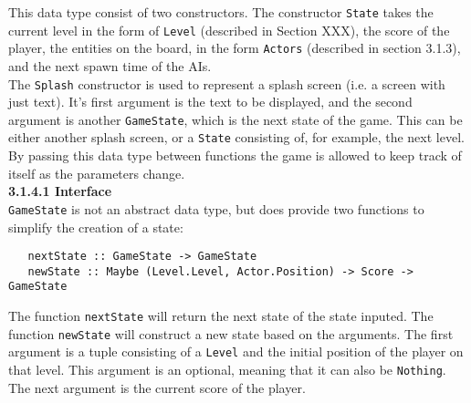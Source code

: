 \documentclass{article}
\begin{document}
    	\noindent This data type consist of two constructors. The constructor \texttt{State} takes the current level in the form of \texttt{Level} (described in Section XXX), the score of the player, the entities on the board, in the form \texttt{Actors} (described in section 3.1.3), and the next spawn time of the AIs. \\
    	\newline
    	The \texttt{Splash} constructor is used to represent a splash screen (i.e. a screen with just text). It's first argument is the text to be displayed, and the second argument is another \texttt{GameState}, which is the next state of the game. This can be either another splash screen, or a \texttt{State} consisting of, for example, the next level.\\
    	\newline
    	By passing this data type between functions the game is allowed to keep track of itself as the parameters change.\\
        \newline
    	\textbf{3.1.4.1 Interface} \\
        \newline
        \texttt{GameState} is not an abstract data type, but does provide two functions to simplify the creation of a state: \\

   \begin{verbatim}
   nextState :: GameState -> GameState
   newState :: Maybe (Level.Level, Actor.Position) -> Score -> GameState
   \end{verbatim}

   		\noindent The function \texttt{nextState} will return the next state of the state inputed. The function \texttt{newState} will construct a new state based on the arguments. The first argument is a tuple consisting of a \texttt{Level} and the initial position of the player on that level. This argument is an optional, meaning that it can also be \texttt{Nothing}. The next argument is the current score of the player.
\end{document}
